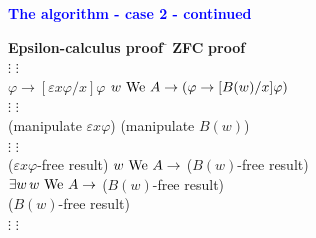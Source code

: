 \documentclass{slides}
\begin{document}
\begin{center}
\textcolor{blue}{\textbf{The algorithm - case 2 - continued}}
\end{center}

\begin{tabbing}
\textbf{Epsilon-}\=\textbf{calculus proof}    \=  \hspace{2em} \=
                     \textbf{ZFC} \= \textbf{proof}         \\
    \>  $\vdots$            \>       \>    \>  $\vdots$                  \\
  $ \varphi \to [\varepsilon x \varphi / x] \varphi$  \> \>  \>
              $w \,\,{\rm We}\,\, A \rightarrow ( \varphi
                                  \rightarrow [ B(w) / x ] \varphi )$  \\
    \>  $\vdots$            \>       \>    \>  $\vdots$                  \\
  (manipulate $\varepsilon x \varphi$)  \> \>  \>
              (manipulate $B(w)$)  \\
    \>  $\vdots$            \>       \>    \>  $\vdots$                  \\
  ($\varepsilon x \varphi$-free result)   \> \>  \>
              $w \,\,{\rm We}\,\, A \rightarrow$
                             ($B(w)$-free result)  \\
                                \> \>  \>
              $\exists w \,w \,\,{\rm We}\,\, A \rightarrow$
                             ($B(w)$-free result)  \\
                                \> \>  \>
                             ($B(w)$-free result)  \\
    \>  $\vdots$            \>       \>    \>  $\vdots$                  \\
\end{tabbing}


\begin{slide}


\end{slide}
\end{document}
